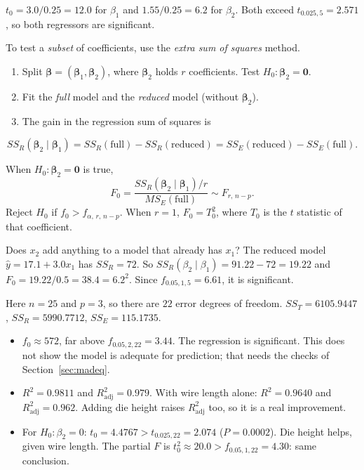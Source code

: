 \begin{example}
$t_0=3.0/0.25=12.0$ for $\beta_1$ and $1.55/0.25=6.2$ for $\beta_2$. Both exceed $t_{0.025,5}=2.571$, so both regressors are significant.
\end{example}

To test a \emph{subset} of coefficients, use the \emph{extra sum of squares} method.
\begin{enumerate}
  \item Split $\boldsymbol\beta=(\boldsymbol\beta_1,\boldsymbol\beta_2)$, where $\boldsymbol\beta_2$ holds $r$ coefficients. Test $H_0:\boldsymbol\beta_2=\mathbf{0}$.
  \item Fit the \emph{full} model and the \emph{reduced} model (without $\boldsymbol\beta_2$).
  \item The gain in the regression sum of squares is
\end{enumerate}
\[ SS_R(\boldsymbol\beta_2\mid\boldsymbol\beta_1)=SS_R(\text{full})-SS_R(\text{reduced})=SS_E(\text{reduced})-SS_E(\text{full}). \]

\begin{theorem}\label{thm:partialF}
When $H_0:\boldsymbol\beta_2=\mathbf{0}$ is true,
\[ F_0=\frac{SS_R(\boldsymbol\beta_2\mid\boldsymbol\beta_1)/r}{MS_E(\text{full})}\sim F_{r,\,n-p}. \]
Reject $H_0$ if $f_0>f_{\alpha,\,r,\,n-p}$. When $r=1$, $F_0=T_0^2$, where $T_0$ is the $t$ statistic of that coefficient.
\end{theorem}

\begin{example}
Does $x_2$ add anything to a model that already has $x_1$? The reduced model $\hat{y}=17.1+3.0x_1$ has $SS_R=72$. So $SS_R(\beta_2\mid\beta_1)=91.22-72=19.22$ and $F_0=19.22/0.5=38.4=6.2^2$. Since $f_{0.05,1,5}=6.61$, it is significant.
\end{example}

\begin{example}
Here $n=25$ and $p=3$, so there are $22$ error degrees of freedom. $SS_T=6105.9447$, $SS_R=5990.7712$, $SS_E=115.1735$.
\begin{itemize}
  \item $f_0\approx572$, far above $f_{0.05,2,22}=3.44$. The regression is significant. This does not show the model is adequate for prediction; that needs the checks of Section~\ref{sec:madeq}.
  \item $R^2=0.9811$ and $R^2_{\mathrm{adj}}=0.979$. With wire length alone: $R^2=0.9640$ and $R^2_{\mathrm{adj}}=0.962$. Adding die height raises $R^2_{\mathrm{adj}}$ too, so it is a real improvement.
  \item For $H_0:\beta_2=0$: $t_0=4.4767>t_{0.025,22}=2.074$ ($P=0.0002$). Die height helps, given wire length. The partial $F$ is $t_0^2\approx20.0>f_{0.05,1,22}=4.30$: same conclusion.
\end{itemize}
\end{example}

